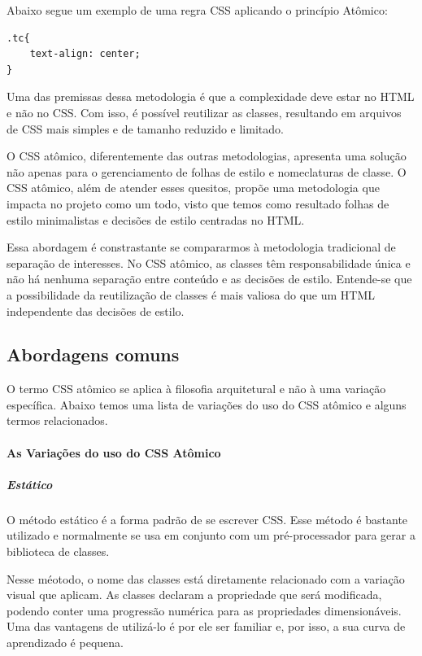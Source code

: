 Abaixo segue um exemplo de uma regra CSS aplicando o princípio Atômico:

\begin{verbatim}
.tc{  
    text-align: center;
}
\end{verbatim}

Uma das premissas dessa metodologia é que a complexidade deve estar no
HTML e não no CSS. Com isso, é possível reutilizar as classes,
resultando em arquivos de CSS mais simples e de tamanho reduzido e limitado.

O CSS atômico, diferentemente das outras metodologias, apresenta uma solução não apenas para o gerenciamento de folhas de estilo e nomeclaturas de classe. O CSS atômico, além de atender esses quesitos, propõe uma metodologia que impacta no projeto como um todo, visto que temos como resultado folhas de estilo minimalistas e decisões de estilo centradas no HTML.

Essa abordagem é constrastante se compararmos à metodologia tradicional
de separação de interesses. No CSS atômico, as classes têm
responsabilidade única e não há nenhuma separação entre conteúdo e as
decisões de estilo. Entende-se que a possibilidade da reutilização de
classes é mais valiosa do que um HTML independente das decisões de
estilo.

\hypertarget{abordagens-comuns}{%
\subsection{Abordagens comuns}\label{abordagens-comuns}}

O termo CSS atômico se aplica à filosofia
arquitetural e não à uma variação específica\cite{polacek}. Abaixo temos uma lista de variações do uso do CSS atômico e alguns termos relacionados.

\hypertarget{as-variauxe7uxf5es-do-uso-do-css-atuxf4mico}{%
\paragraph{As Variações do uso do CSS
Atômico}\label{as-variauxe7uxf5es-do-uso-do-css-atuxf4mico}}

\hypertarget{estuxe1tico}{%
\subparagraph{Estático}\label{estuxe1tico}}

O método estático é a forma padrão de se escrever CSS. Esse método é
bastante utilizado e normalmente se usa em conjunto com um
pré-processador para gerar a biblioteca de classes.

Nesse méotodo, o nome das classes está diretamente relacionado com a variação visual que aplicam. As classes declaram a propriedade que será modificada, podendo conter uma progressão numérica para as propriedades dimensionáveis. Uma das vantagens de utilizá-lo é por ele ser familiar e,
por isso, a sua curva de aprendizado é pequena.

